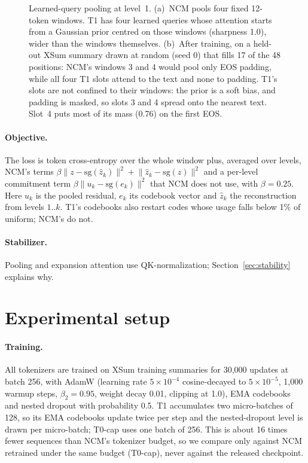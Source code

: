 \documentclass[11pt]{article}
\begin{document}
\begin{figure}[t]
\caption{Learned-query pooling at level~1. (a)~NCM pools four fixed 12-token windows. T1 has four learned queries whose attention starts from a Gaussian prior centred on those windows (sharpness 1.0), wider than the windows themselves. (b)~After training, on a held-out XSum summary drawn at random (seed 0) that fills 17 of the 48 positions: NCM's windows 3 and 4 would pool only EOS padding, while all four T1 slots attend to the text and none to padding. T1's slots are not confined to their windows: the prior is a soft bias, and padding is masked, so slots 3 and 4 spread onto the nearest text. Slot~4 puts most of its mass (0.76) on the first EOS.}
\label{fig:pooling}
\end{figure}

\paragraph{Objective.} The loss is token cross-entropy over the whole window plus, averaged over levels, NCM's terms $\beta\lVert z-\mathrm{sg}(\hat z_k)\rVert^2+\lVert\hat z_k-\mathrm{sg}(z)\rVert^2$ and a per-level commitment term $\beta\lVert u_k-\mathrm{sg}(e_k)\rVert^2$ that NCM does not use, with $\beta=0.25$. Here $u_k$ is the pooled residual, $e_k$ its codebook vector and $\hat z_k$ the reconstruction from levels $1..k$. T1's codebooks also restart codes whose usage falls below 1\% of uniform; NCM's do not.

\paragraph{Stabilizer.} Pooling and expansion attention use QK-normalization; Section~\ref{sec:stability} explains why.

\section{Experimental setup}
\paragraph{Training.} All tokenizers are trained on XSum training summaries \citep{narayan2018xsum} for 30{,}000 updates at batch 256, with AdamW (learning rate $5{\times}10^{-4}$ cosine-decayed to $5{\times}10^{-5}$, 1{,}000 warmup steps, $\beta_2{=}0.95$, weight decay 0.01, clipping at 1.0), EMA codebooks and nested dropout with probability 0.5. T1 accumulates two micro-batches of 128, so its EMA codebooks update twice per step and the nested-dropout level is drawn per micro-batch; T0-cap uses one batch of 256. This is about 16 times fewer sequences than NCM's tokenizer budget, so we compare only against NCM retrained under the same budget (T0-cap), never against the released checkpoint.
\end{document}
